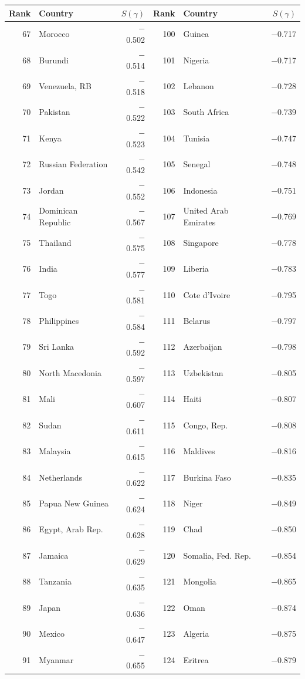 \begin{tabular}{rlr|rlr}
\toprule
Rank & Country & $S(\gamma)$ & Rank & Country & $S(\gamma)$ \\
\midrule
67 & Morocco & $-$0.502 & 100 & Guinea & $-$0.717 \\
68 & Burundi & $-$0.514 & 101 & Nigeria & $-$0.717 \\
69 & Venezuela, RB & $-$0.518 & 102 & Lebanon & $-$0.728 \\
70 & Pakistan & $-$0.522 & 103 & South Africa & $-$0.739 \\
71 & Kenya & $-$0.523 & 104 & Tunisia & $-$0.747 \\
72 & Russian Federation & $-$0.542 & 105 & Senegal & $-$0.748 \\
73 & Jordan & $-$0.552 & 106 & Indonesia & $-$0.751 \\
74 & Dominican Republic & $-$0.567 & 107 & United Arab Emirates & $-$0.769 \\
75 & Thailand & $-$0.575 & 108 & Singapore & $-$0.778 \\
76 & India & $-$0.577 & 109 & Liberia & $-$0.783 \\
77 & Togo & $-$0.581 & 110 & Cote d'Ivoire & $-$0.795 \\
78 & Philippines & $-$0.584 & 111 & Belarus & $-$0.797 \\
79 & Sri Lanka & $-$0.592 & 112 & Azerbaijan & $-$0.798 \\
80 & North Macedonia & $-$0.597 & 113 & Uzbekistan & $-$0.805 \\
81 & Mali & $-$0.607 & 114 & Haiti & $-$0.807 \\
82 & Sudan & $-$0.611 & 115 & Congo, Rep. & $-$0.808 \\
83 & Malaysia & $-$0.615 & 116 & Maldives & $-$0.816 \\
84 & Netherlands & $-$0.622 & 117 & Burkina Faso & $-$0.835 \\
85 & Papua New Guinea & $-$0.624 & 118 & Niger & $-$0.849 \\
86 & Egypt, Arab Rep. & $-$0.628 & 119 & Chad & $-$0.850 \\
87 & Jamaica & $-$0.629 & 120 & Somalia, Fed. Rep. & $-$0.854 \\
88 & Tanzania & $-$0.635 & 121 & Mongolia & $-$0.865 \\
89 & Japan & $-$0.636 & 122 & Oman & $-$0.874 \\
90 & Mexico & $-$0.647 & 123 & Algeria & $-$0.875 \\
91 & Myanmar & $-$0.655 & 124 & Eritrea & $-$0.879 \\

\end{tabular}
